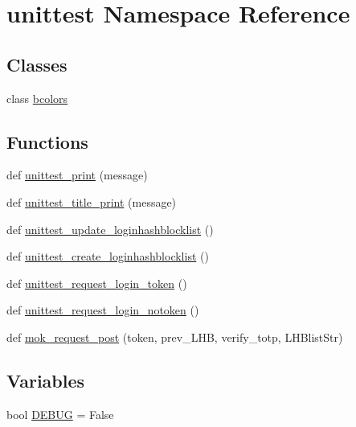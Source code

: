 \hypertarget{namespaceunittest}{}\section{unittest Namespace Reference}
\label{namespaceunittest}
\subsection*{Classes}
\begin{DoxyCompactItemize}
\item 
class \hyperlink{classunittest_1_1bcolors}{bcolors}
\end{DoxyCompactItemize}
\subsection*{Functions}
\begin{DoxyCompactItemize}
\item 
def \hyperlink{namespaceunittest_a217a1a3af5bc9748f2f6194bf79402bc}{unittest\+\_\+print} (message)
\item 
def \hyperlink{namespaceunittest_a642ec5401fe406315f1489d237ba826e}{unittest\+\_\+title\+\_\+print} (message)
\item 
def \hyperlink{namespaceunittest_a9e16eaba67b93461be6ea8ef6332507a}{unittest\+\_\+update\+\_\+loginhashblocklist} ()
\item 
def \hyperlink{namespaceunittest_a0e10bea14aac2cc6a08d76f422b9328d}{unittest\+\_\+create\+\_\+loginhashblocklist} ()
\item 
def \hyperlink{namespaceunittest_aa1c9f3b8631f7f60770414cf8958e2be}{unittest\+\_\+request\+\_\+login\+\_\+token} ()
\item 
def \hyperlink{namespaceunittest_a8b30a1b14f91e9e9d093c13a7e68ee93}{unittest\+\_\+request\+\_\+login\+\_\+notoken} ()
\item 
def \hyperlink{namespaceunittest_afeccd95cc658ca5f2ffb4df7a1edbbd2}{mok\+\_\+request\+\_\+post} (token, prev\+\_\+\+L\+HB, verify\+\_\+totp, L\+H\+Blist\+Str)
\end{DoxyCompactItemize}
\subsection*{Variables}
\begin{DoxyCompactItemize}
\item 
bool \hyperlink{namespaceunittest_a6f95c254ae4668ea73efe6cf7ca3c36d}{D\+E\+B\+UG} = False
\end{DoxyCompactItemize}


